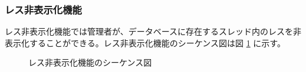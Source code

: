 \documentclass[a4j]{jarticle}
\begin{document}
  \subsubsection{レス非表示化機能}
  レス非表示化機能では管理者が、データベースに存在するスレッド内のレスを非表示化することができる。レス非表示化機能のシーケンス図は図 \ref{fig:admin_bbs_res-hide.png} に示す。
  \begin{figure}[H]
    \centering
    \caption{レス非表示化機能のシーケンス図}
    \label{fig:admin_bbs_res-hide.png}
  \end{figure}
\end{document}
